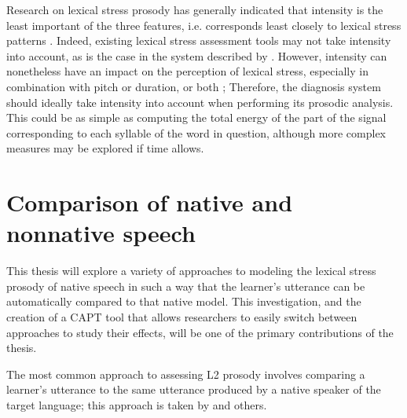 


		Research on lexical stress prosody has generally indicated that intensity is the least important of the three features, i.e. corresponds least closely to lexical stress patterns \citep{Cutler2005}. 
Indeed, existing lexical stress assessment tools may not take intensity into account, as is the case in the system described by \textcite{Bonneau2011}.  However, intensity can nonetheless have an impact on the perception of lexical stress, especially in combination with pitch or duration, or both \citep{Cutler2005}; %
Therefore, the diagnosis system should ideally take intensity into account when performing its prosodic analysis. This could be as simple as computing the total energy of the part of the signal corresponding to each syllable of the word in question, although more complex measures may be explored if time allows.
	
\section{Comparison of native and nonnative speech}
\label{sec:diag:compare}

	This thesis will explore a variety of approaches to modeling the lexical stress prosody of native speech in such a way that the learner's utterance can be automatically compared to that native model. This investigation, and the creation of a CAPT tool that allows researchers to easily switch between approaches to study their effects, will be one of the primary contributions of the thesis.
	
	
	The most common approach to assessing L2 prosody involves comparing a learner's utterance to the same utterance produced by a native speaker of the target language; this approach is taken by \textcite{Bonneau2011} and others.%
	
